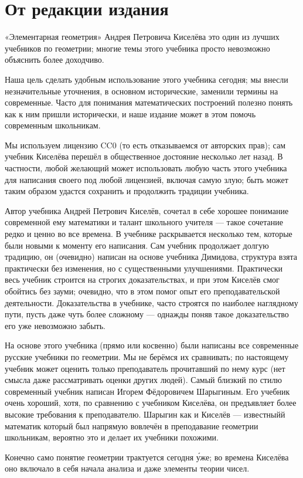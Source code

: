 \section*{От редакции издания}


«Элементарная геометрия» Андрея Петровича Киселёва это один из лучших учебников по геометрии;
многие темы этого учебника просто невозможно объяснить более доходчиво.

Наша цель сделать удобным использование этого учебника сегодня;
мы внесли незначительные уточнения, в основном исторические, заменили термины на современные. 
Часто для понимания математических построений полезно понять как к ним пришли исторически,
и наше издание может в этом помочь современным школьникам.

Мы используем лицензию CC0 (то есть отказываемся от авторских прав); сам учебник Киселёва перешёл в общественное достояние несколько лет назад.
В частности, любой желающий может использовать любую часть этого учебника для написания своего под любой лицензией, включая самую злую;
быть может таким образом удастся сохранить и продолжить традиции учебника. 

Автор учебника Андрей Петрович Киселёв, сочетал в себе хорошее понимание современной ему математики и талант школьного учителя --- такое сочетание редко и ценно во все времена.
В учебнике раскрывается несколько тем, которые были новыми к моменту его написания. 
Сам учебник продолжает долгую традицию, он (очевидно) написан на основе учебника Димидова, структура взята практически без изменения, но с существенными улучшениями.
Практически весь учебник строится на строгих доказательствах, и при этом Киселёв смог обойтись без зауми;
очевидно, что в этом помог опыт его преподавательской деятельности.
Доказательства в учебнике, часто строятся по наиболее наглядному пути, пусть даже чуть более сложному --- однажды поняв такое доказательство его уже невозможно забыть.

На основе этого учебника (прямо или косвенно) были написаны все современные русские учебники по геометрии.
Мы не берёмся их сравнивать; по настоящему учебник может оценить только преподаватель прочитавший по нему курс (нет смысла даже рассматривать оценки других людей).
Самый близкий по стилю современный учебник написан Игорем Фёдоровичем Шарыгиным.
Его учебник очень хороший, хотя, по сравнению с учебником Киселёва, он предъявляет более высокие требования к преподавателю.
Шарыгин как и Киселёв --- известныйй математик который был напрямую вовлечён в преподавание геометрии школьникам, вероятно это и делает их учебники похожими.

Конечно само понятие геометрии трактуется сегодня \'{у}же; во времена Киселёва оно включало в себя начала анализа и даже элементы теории чисел.

\clearpage
